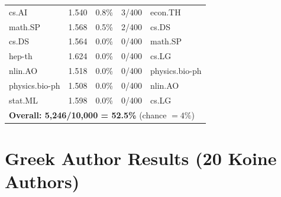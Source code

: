 \documentclass[11pt,letterpaper]{article}
\begin{document}
\begin{longtable}{lrrrl}
cs.AI & 1.540 & 0.8\% & 3/400 & econ.TH \\
math.SP & 1.568 & 0.5\% & 2/400 & cs.DS \\
cs.DS & 1.564 & 0.0\% & 0/400 & math.SP \\
hep-th & 1.624 & 0.0\% & 0/400 & cs.LG \\
nlin.AO & 1.518 & 0.0\% & 0/400 & physics.bio-ph \\
physics.bio-ph & 1.508 & 0.0\% & 0/400 & nlin.AO \\
stat.ML & 1.598 & 0.0\% & 0/400 & cs.LG \\
\midrule
\multicolumn{5}{l}{\textbf{Overall: 5{,}246/10{,}000 = 52.5\%}
(chance $= 4\%$)} \\
\bottomrule
\end{longtable}


\section{Greek Author Results (20 Koine Authors)}
\label{sec:greek_full}
\end{document}
